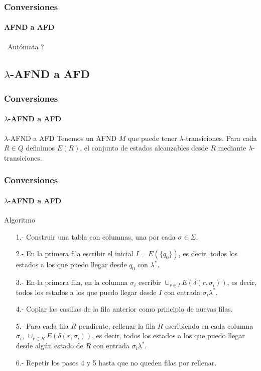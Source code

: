 \documentclass{beamer}
\begin{document}
        \begin{frame}
			\frametitle{Conversiones}
			\framesubtitle{AFND a AFD}
           
               \hspace{4cm}\huge{\textquestiondown~Aut\'omata ?}
		\end{frame}	
		
        \subsection{$\lambda$-AFND a AFD}		
		
        \begin{frame}
			\frametitle{Conversiones}
			\framesubtitle{$\lambda$-AFND a AFD}

            \begin{block}{$\lambda$-AFND a AFD}
               Tenemos un AFND $M$ que puede tener $\lambda$-transiciones. Para cada $R \in Q$ definimos $E(R)$, el conjunto de estados alcanzables desde $R$ mediante $\lambda$-transiciones.
            \end{block}
		\end{frame}

        \begin{frame}
			\frametitle{Conversiones}
			\framesubtitle{$\lambda$-AFND a AFD}

            \begin{block}{Algoritmo}
               \begin{enumerate}
                   \item[1.-] Construir una tabla con columnas, una por cada $\sigma \in \Sigma$.
                   \item[2.-] En la primera fila escribir el inicial $I = E(\{q_{0}\})$, es decir, todos los estados a los que puedo llegar desde $q_{0}$ con $\lambda^{*}$.
                   \item[3.-] En la primera fila, en la columna $\sigma_{i}$ escribir $\cup_{r \in I} E(\delta(r,\sigma_{i}))$, es decir, todos los estados a los que puedo llegar desde $I$ con entrada $\sigma_{i}\lambda^{*}$.
                   \item[4.-] Copiar las casillas de la fila anterior como principio de nuevas filas.
                   \item[5.-] Para cada fila $R$ pendiente, rellenar la fila $R$ escribiendo en cada columna $\sigma_{i}$, $\cup_{r \in R} E(\delta(r,\sigma_{i}))$, es decir, todos los estados a los que puedo llegar desde alg\'un estado de $R$ con entrada $\sigma_{i}\lambda^{*}$.
                   \item[6.-] Repetir los pasos 4 y 5 hasta que no queden filas por rellenar.
               \end{enumerate}
            \end{block}
		\end{frame}
\end{document}
